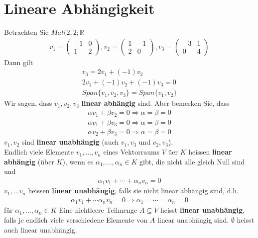 \documentclass[11pt]{report}
\newcommand*\Zb[1] {\mathbb{#1}}
\newcommand*\f[1] {\textbf{#1}}
\begin{document}
\section{Lineare Abhängigkeit}
Betrachten Sie $Mat(2, 2; \Zb{R}$
\begin{align}
 v_1 = \begin{pmatrix} -1 & 0 \\ 1 & 2 \end{pmatrix}, v_2 = \begin{pmatrix} 1 & -1 \\ 2 & 0 \end{pmatrix}, v_3 = \begin{pmatrix} -3 & 1 \\ 0 & 4 \end{pmatrix}
\end{align}
Dann gilt 
\begin{align}
 v_3 = 2v_1 + (-1)v_2 \\
 2v_1 + (-1)v_2 + (-1)v_3 = 0 \\
Span\{v_1, v_2, v_3\} = Span\{v_1, v_2\}
\end{align}
Wir sagen, dass $v_1, v_2, v_3$ \f{linear abhängig} sind. Aber bemerken Sie, dass
\begin{align}
 \alpha v_1 + \beta v_2 = 0 \Rightarrow \alpha = \beta = 0 \\
 \alpha v_1 + \beta v_3 = 0 \Rightarrow \alpha = \beta = 0 \\
 \alpha v_2 + \beta v_3 = 0 \Rightarrow \alpha = \beta = 0 
\end{align}
$v_1, v_2$ sind \f{linear unabhängig} (auch $v_1, v_3$ und $v_2, v_3$). \\
Endlich viele Elemente $v_1, ..., v_n$ eines Vektorraums $V$ üer $K$ heissen \f{linear abhängig} (über $K$), wenn es $\alpha_1, ..., \alpha_n \in K$ gibt, die nicht alle gleich Null sind und
\begin{align}
 \alpha_1 v_1 + \cdots + \alpha_n v_n = 0
\end{align}
$v_1, ... v_n$ heissen \f{linear unabhängig}, falls sie nicht linear abhängig sind, d.h.
\begin{align}
 \alpha_1 v_1 + \cdots \alpha_n v_n = 0 \Rightarrow \alpha_1 = \cdots = \alpha_n = 0
\end{align}
für $\alpha_1, ..., \alpha_n\in K$
Eine nichtleere Teilmenge $A \subseteq V$ heisst \f{linear unabhängig}, falls je endlich viele verschiedene Elemente von $A$ linear unabhängig sind. $\emptyset$ heisst auch linear unabhängig.
\end{document}

